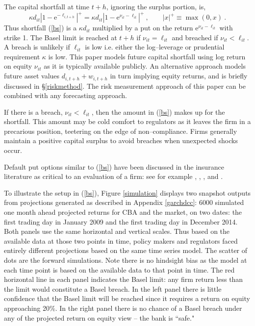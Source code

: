 \documentclass[12pt]{article}
\newcommand{\e}{\mathrm{e}}
\newcommand{\eref}[1]{(\ref{#1})}
\newcommand{\fref}[1]{Figure \ref{#1}}
\newcommand{\sref}[1]{\S\ref{#1}}
\newcommand{\aref}[1]{Appendix \ref{#1}}
\newcommand{\cq}{\ , \qquad}
\newcommand{\be}[1]{\begin{equation}\label{#1}}
\newcommand{\ee}{\end{equation}}
\begin{document}
The capital  shortfall  at time $t+h$, ignoring the surplus portion, is,
\be{bs}
\kappa d_{it} \left|1-\e^{-\ell_{i,t+h}}\right|^+=\kappa d_{it} \left|1-\e^{\nu_{it}-\ell_{it}}\right|^+
\cq  |x|^+\equiv \max(0,x)\ .
\ee
Thus shortfall \eref{bs} is a $\kappa d_{it}$ multiplied by a put on the return $\e^{\nu_{it}-\ell_{it}}$  with strike 1.
The Basel  limit is reached at $t+h$ if $\nu_{it}=\ell_{it}$ and  breached  if
$\nu_{it}< \ell_{it}$.
A breach is  unlikely if $\ell_{it}$ is low i.e. either the log--leverage or prudential requirement $\kappa$ is low. This paper models future capital shortfall using log return on equity $\nu_{it}$ as it is typically available publicly. An alternative approach models future asset values $d_{i,t+h}+w_{i,t+h}$ in turn implying equity returns, and is briefly discussed in \sref{riskmethod}. The risk measurement approach of this paper can be combined with any forecasting approach.


If there is a breach, $\nu_{it}<\ell_{it}$, then the amount in \eref{bs} makes up for the shortfall.   This amount may be cold comfort to regulators as it leaves the firm in a precarious position, teetering on the edge of non--compliance. Firms generally maintain a positive capital surplus to avoid breaches when unexpected shocks occur.

Default put options similar to \eref{bs} have been discussed in the insurance literature as critical to an evaluation of a firm:  see for
example \citet{merton1977analytic}, \citet{doherty1986price}, \citet{cummins1988risk}, \citet{myers2001capital} and \citet{sherris2006solvency}.

To illustrate the setup in \eref{bs}, \fref{simulation}   displays two snapshot outputs from projections generated as described  in \aref{garchdcc}:  6000  simulated one month ahead projected returns for  CBA and the market, on  two dates: the first trading day in January 2009 and the first trading day in December 2014.    Both panels use the same horizontal and vertical scales.   Thus based on the available data at those two points in  time, policy makers and regulators faced entirely different projections based on the same time series model.   The scatter of dots are the forward simulations.  Note there is no hindsight bias as the model at each time point is based on the available data to that point in time.    The red horizontal line in each panel indicates the Basel limit:  any firm return less than the limit would constitute a Basel breach.   In the left panel there is little confidence that the Basel limit will be reached since it requires a return on equity approaching 20\%.  In the right panel there is no chance of a Basel breach under any of the projected return on equity view -- the bank is ``safe."
\end{document}

